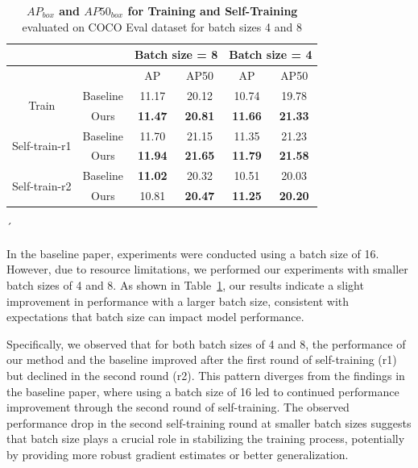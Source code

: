 \begin{table}[htbp]
	\centering
	\begin{tabular}{c|c|cc|cc}
		\toprule
		& & \multicolumn{2}{c|}{Batch size = 8} & \multicolumn{2}{c}{Batch size = 4} \\ \midrule
		& & AP & AP50 & AP & AP50 \\ \midrule
		\multirow{2}{*}{Train} & Baseline & 11.17 & 20.12 & 10.74 & 19.78 \\ 
		& Ours & \textbf{11.47} & \textbf{20.81} & \textbf{11.66} & \textbf{21.33} \\ \midrule
		\multirow{2}{*}{Self-train-r1} & Baseline & 11.70 & 21.15 & 11.35 & 21.23 \\ 
		& Ours & \textbf{11.94} & \textbf{21.65} & \textbf{11.79} & \textbf{21.58} \\ \midrule
		\multirow{2}{*}{Self-train-r2} & Baseline & \textbf{11.02} & 20.32 & 10.51 & 20.03 \\ 
		& Ours & 10.81 & \textbf{20.47} & \textbf{11.25} & \textbf{20.20 }\\ \bottomrule
	\end{tabular}
	\caption[\textbf{\(AP_{box}\) and \(AP50_{box}\) for Training and Self-Training} for different batch sizes]{\textbf{\(AP_{box}\) and \(AP50_{box}\) for Training and Self-Training} evaluated on COCO Eval dataset  for batch sizes 4 and 8}
	\label{tab:batch_size_table}
´\end{table}

In the baseline paper, experiments were conducted using a batch size of 16. However, due to resource limitations, we performed our experiments with smaller batch sizes of 4 and 8. As shown in Table~\ref{tab:batch_size_table}, our results indicate a slight improvement in performance with a larger batch size, consistent with expectations that batch size can impact model performance.

Specifically, we observed that for both batch sizes of 4 and 8, the performance of our method and the baseline improved after the first round of self-training (r1) but declined in the second round (r2). This pattern diverges from the findings in the baseline paper, where using a batch size of 16 led to continued performance improvement through the second round of self-training. The observed performance drop in the second self-training round at smaller batch sizes suggests that batch size plays a crucial role in stabilizing the training process, potentially by providing more robust gradient estimates or better generalization.

